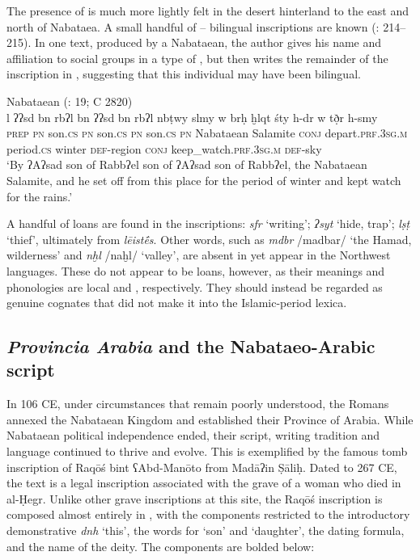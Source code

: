 \documentclass[output=paper]{langsci/langscibook}
\begin{document}
The presence of  is much more lightly felt in the desert hinterland to the east and north of Nabataea. A small handful of -- bilingual inscriptions are known (\citealt{Hayajneh2009}: 214--215). In one  text, produced by a Nabataean, the author gives his name and affiliation to social groups in a type of , but then writes the remainder of the inscription in  , suggesting that this individual may have been bilingual.\pagebreak

\ea Nabataean  (\citealt{Al-Jallad2015Safaitic}: 19; C 2820) \\ 
\gll l ʔʔsd bn rbʔl bn ʔʔsd bn rbʔl nbṭwy slmy w brḥ ḫlqt śty h-dr w tð̣r h-smy \\
\textsc{prep} \textsc{pn} son.\textsc{cs} \textsc{pn} son.\textsc{cs} \textsc{pn} son.\textsc{cs} \textsc{pn} Nabataean Salamite \textsc{conj} depart.\textsc{prf.3sg.m} period.\textsc{cs} winter \textsc{def}-region \textsc{conj} keep\_watch.\textsc{prf.3sg.m} \textsc{def}-sky \\
\glt `By ʔAʔsad son of Rabbʔel son of  ʔAʔsad son of Rabbʔel, the Nabataean Salamite, and he set off from this place for the period of winter and kept watch for the rains.' \\
\z

A handful of  loans are found in the  inscriptions: \textit{sfr} ‘writing’; \textit{ʔsyt} ‘hide, trap’; \textit{lṣṭ} ‘thief’, ultimately from  \textit{lēistḗs}. Other words, such as \textit{mdbr} /madbar/ ‘the Hamad, wilderness’ and \textit{nḫl} /naḫl/ ‘valley’, are absent in   yet appear in the Northwest  languages. These do not appear to be loans, however, as their meanings and phonologies are local and , respectively. They should instead be regarded as genuine cognates that did not make it into the Islamic-period lexica. 

\subsection{\textit{Provincia Arabia} and the Nabataeo-Arabic script}\label{Provincia}
In 106 CE, under circumstances that remain poorly understood, the Romans annexed the Nabataean Kingdom and established their Province of Arabia. While Nabataean political independence ended, their script, writing tradition and language continued to thrive and evolve. This is exemplified by the famous tomb inscription of Raqōś bint ʕAbd-Manōto from Madāʔin Ṣāliḥ. Dated to 267 CE, the text is a legal inscription associated with the grave of a woman who died in al-Ḥegr. Unlike other grave inscriptions at this site, the Raqōś inscription is composed almost entirely in , with the  components restricted to the introductory demonstrative \textit{dnh} ‘this’, the words for ‘son’ and ‘daughter’, the dating formula, and the name of the deity. The  components are bolded below:
\end{document}
